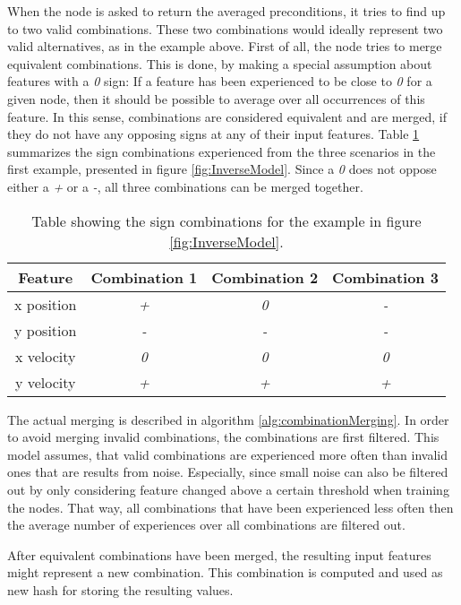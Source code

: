 When the node is asked to return the averaged preconditions, it tries to find up to two valid combinations. These two combinations would ideally represent two valid alternatives, as in the example above. 
First of all, the node tries to merge equivalent combinations. This is done, by making a special assumption about features with a \textit{0} sign: If a feature has been experienced to be close to \textit{0} for a given node, then it should be possible to average over all occurrences of this feature. In this sense, combinations are considered equivalent and are merged, if they do not have any opposing signs at any of their input features. 
Table \ref{tab:signCombinations2} summarizes the sign combinations experienced from the three scenarios in the first example, presented in figure \ref{fig:InverseModel}.
Since a \textit{0} does not oppose either a \textit{+} or a \textit{-}, all three combinations can be merged together.

\begin{table}
	\centering
	\begin{tabular}{|c|c|c|c|}
		\hline Feature & Combination 1 & Combination 2 & Combination 3 \\ 
		\hline x position & \textit{+} & \textit{0} & \textit{-} \\ 
		\hline y position & \textit{-} & \textit{-} & \textit{-} \\ 
		\hline x velocity & \textit{0} & \textit{0} & \textit{0} \\
		\hline y velocity & \textit{+} & \textit{+} & \textit{+} \\ 
		\hline 
	\end{tabular} 
	\caption{Table showing the sign combinations for the example in figure \ref{fig:InverseModel}.}
	\label{tab:signCombinations2}
\end{table}

The actual merging is described in algorithm \ref{alg:combinationMerging}. In order to avoid merging invalid combinations, the combinations are first filtered. This model assumes, that valid combinations are experienced more often than invalid ones that are results from noise. Especially, since small noise can also be filtered out by only considering feature changed above a certain threshold when training the nodes. That way, all combinations that have been experienced less often then the average number of experiences over all combinations are filtered out. 

After equivalent combinations have been merged, the resulting input features might represent a new combination. This combination is computed and used as new hash for storing the resulting values. 

